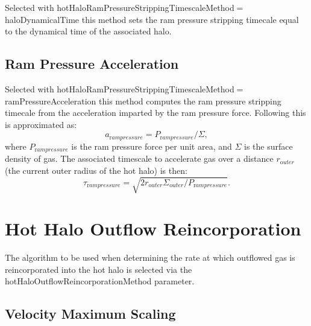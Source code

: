 Selected with {\normalfont \ttfamily hotHaloRamPressureStrippingTimescaleMethod}$=${\normalfont \ttfamily haloDynamicalTime} this method sets the ram pressure stripping timecale equal to the dynamical time of the associated halo.

\subsection{Ram Pressure Acceleration}

Selected with {\normalfont \ttfamily hotHaloRamPressureStrippingTimescaleMethod}$=${\normalfont \ttfamily ramPressureAcceleration} this method computes the ram pressure stripping timecale from the acceleration imparted by the ram pressure force. Following \cite{roediger_ram_2007} this is approximated as:
\begin{equation}
 a_{\mathrm ram pressure} = P_{\mathrm ram pressure}/\Sigma,
\end{equation}
where $P_{\mathrm ram pressure}$ is the ram pressure force per unit area, and $\Sigma$ is the surface density of gas. The associated timescale to accelerate gas over a distance $r_{\mathrm outer}$ (the current outer radius of the hot halo) is then:
\begin{equation}
 \tau_{\mathrm ram pressure} = \sqrt{2 r_{\mathrm outer} \Sigma_{\mathrm outer} / P_{\mathrm ram pressure}}.
\end{equation}

\section{Hot Halo Outflow Reincorporation}\label{phys:hotHaloOutflowReincorporation}

The algorithm to be used when determining the rate at which outflowed gas is reincorporated into the hot halo is selected via the {\normalfont \ttfamily hotHaloOutflowReincorporationMethod} parameter.

\subsection{Velocity Maximum Scaling}\label{phys:hotHaloOutflowReincorporation:hotHaloOutflowReincorporationVelocityMaximumScaling}

